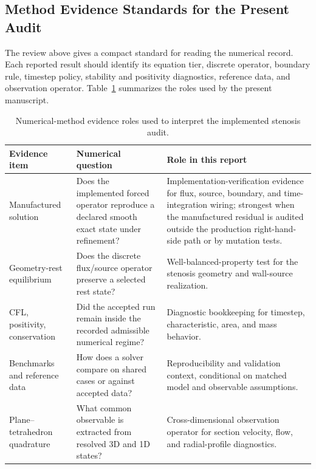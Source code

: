 \subsection{Method Evidence Standards for the Present Audit}
\label{subsec:numerical-methods-evidence-standards}

The review above gives a compact standard for reading the numerical record.
Each reported result should identify its equation tier, discrete operator,
boundary rule, timestep policy, stability and positivity diagnostics, reference
data, and observation operator. Table~\ref{tab:numerical-methods-evidence-map}
summarizes the roles used by the present manuscript.

\begin{table}[!htb]
    \centering
    \scriptsize
    \caption{Numerical-method evidence roles used to interpret the implemented
    stenosis audit.}
    \label{tab:numerical-methods-evidence-map}
    \begin{tabularx}{\textwidth}{@{}p{}p{}X@{}}
        \toprule
        \textbf{Evidence item} & \textbf{Numerical question} & \textbf{Role in this report} \\
        \midrule
        Manufactured solution
            & Does the implemented forced operator reproduce a declared smooth exact
            state under refinement?
            & Implementation-verification evidence for flux, source, boundary, and
            time-integration wiring; strongest when the manufactured residual is
            audited outside the production right-hand-side path or by mutation
            tests. \\
        Geometry-rest equilibrium
            & Does the discrete flux/source operator preserve a selected rest state?
            & Well-balanced-property test for the stenosis geometry and wall-source
            realization. \\
        CFL, positivity, conservation
            & Did the accepted run remain inside the recorded admissible numerical
            regime?
            & Diagnostic bookkeeping for timestep, characteristic, area, and mass
            behavior. \\
        Benchmarks and reference data
            & How does a solver compare on shared cases or against accepted data?
            & Reproducibility and validation context, conditional on matched model
            and observable assumptions. \\
        Plane--tetrahedron quadrature
            & What common observable is extracted from resolved 3D and 1D states?
            & Cross-dimensional observation operator for section velocity, flow, and
            radial-profile diagnostics. \\
        \bottomrule
    \end{tabularx}
\end{table}

